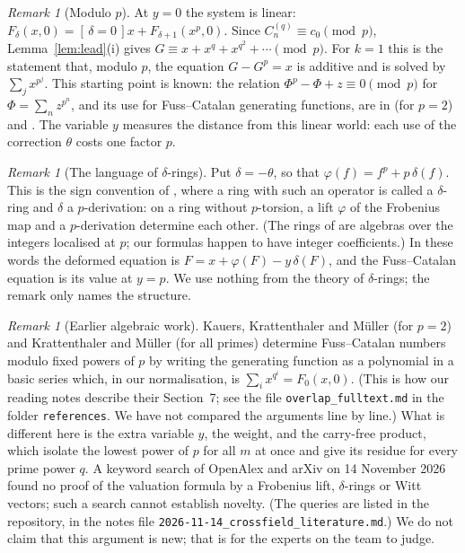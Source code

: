 \documentclass[11pt]{article}
\theoremstyle{definition}
\theoremstyle{remark}
\newtheorem{remark}[theorem]{Remark}
\newcommand{\C}{C_n^{(q)}}
\newcommand{\br}[1]{[\,#1\,]}
\begin{document}
\begin{remark}[Modulo $p$]
At $y=0$ the system is linear: $F_\delta(x,0)=\br{\delta=0}x+F_{\delta+1}(x^p,0)$. Since
$\C\equiv c_0\pmod p$, Lemma~\ref{lem:lead}(i) gives $G\equiv x+x^{q}+x^{q^2}+\cdots\pmod p$.
For $k=1$ this is the statement that, modulo $p$, the equation $G-G^p=x$ is additive and is
solved by $\sum_jx^{p^j}$. This starting point is known: the relation
$\Phi^p-\Phi+z\equiv0\pmod p$ for $\Phi=\sum_nz^{p^n}$, and its use for Fuss--Catalan
generating functions, are in \cite{KKM} (for $p=2$) and \cite{KM}. The variable $y$ measures
the distance from this linear world: each use of the correction $\theta$ costs one factor $p$.
\end{remark}

\begin{remark}[The language of $\delta$-rings]
Put $\delta=-\theta$, so that $\varphi(f)=f^p+p\,\delta(f)$. This is the sign convention of
\cite[Definition~2.1 and Remark~2.2]{BS}, where a ring with such an operator is called a
$\delta$-ring and $\delta$ a $p$-derivation: on a ring without $p$-torsion, a lift $\varphi$
of the Frobenius map and a $p$-derivation determine each other. (The rings of \cite{BS} are
algebras over the integers localised at $p$; our formulas happen to have integer
coefficients.) In these words the deformed equation is
$F=x+\varphi(F)-y\,\delta(F)$, and the Fuss--Catalan equation is its value at $y=p$. We use
nothing from the theory of $\delta$-rings; the remark only names the structure.
\end{remark}

\begin{remark}[Earlier algebraic work]
Kauers, Krattenthaler and M\"uller \cite{KKM} (for $p=2$) and Krattenthaler and M\"uller
\cite{KM} (for all primes) determine Fuss--Catalan numbers modulo fixed powers of
$p$ by writing the generating function as a polynomial in a basic series which, in our
normalisation, is $\sum_ix^{q^i}=F_0(x,0)$. (This is how our reading notes describe their
Section~7; see the file \texttt{overlap\_fulltext.md} in the folder \texttt{references}. We
have not compared the arguments line by line.) What is different here is the extra variable $y$, the weight, and
the carry-free product, which isolate the lowest power of $p$ for all $m$ at once and give
its residue for every prime power $q$. A keyword search of OpenAlex and arXiv on 14 November
2026 found no proof of the valuation formula by a Frobenius lift, $\delta$-rings or Witt
vectors; such a search cannot establish novelty. (The queries are listed in the repository,
in the notes file \nolinkurl{2026-11-14_crossfield_literature.md}.) We do not claim that this argument is new; that is for the
experts on the team to judge.
\end{remark}
\end{document}
